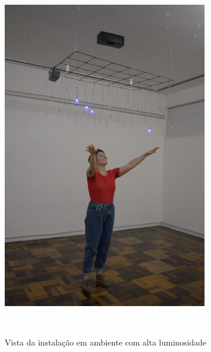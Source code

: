 \begin{apendicesenv}
\begin{figure}[H]
  \begin{center}
    \caption{Vista da instalação em ambiente com alta luminosidade}
    \vspace*{0,2cm}
    \includegraphics[width=0.8\textwidth]{./04-figuras/instalacao_8}
    \label{fig:instalacao_8}
  \end{center}
  \vspace*{-0,9cm}
  \\
\end{figure}


\end{apendicesenv}

